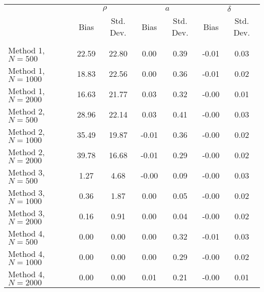 \begin{tabular}{lcccccc} \\\toprule
 & \multicolumn{2}{c}{$\rho$} & \multicolumn{2}{c}{$a$} & \multicolumn{2}{c}{$\delta$} \\ 
 & Bias & Std. Dev. & Bias & Std. Dev. & Bias & Std. Dev. \\
\cmidrule(r){2-3}\cmidrule(r){4-5}\cmidrule(r){6-7} \\
Method 1, $N=500$ & 22.59 & 22.80 & 0.00 & 0.39 & -0.01 & 0.03\\
Method 1, $N=1000$ & 18.83 & 22.56 & 0.00 & 0.36 & -0.01 & 0.02\\
Method 1, $N=2000$ & 16.63 & 21.77 & 0.03 & 0.32 & -0.00 & 0.01\\
Method 2, $N=500$ & 28.96 & 22.14 & 0.03 & 0.41 & -0.00 & 0.03\\
Method 2, $N=1000$ & 35.49 & 19.87 & -0.01 & 0.36 & -0.00 & 0.02\\
Method 2, $N=2000$ & 39.78 & 16.68 & -0.01 & 0.29 & -0.00 & 0.02\\
Method 3, $N=500$ & 1.27 & 4.68 & -0.00 & 0.09 & -0.00 & 0.03\\
Method 3, $N=1000$ & 0.36 & 1.87 & 0.00 & 0.05 & -0.00 & 0.02\\
Method 3, $N=2000$ & 0.16 & 0.91 & 0.00 & 0.04 & -0.00 & 0.02\\
Method 4, $N=500$ & 0.00 & 0.00 & 0.00 & 0.32 & -0.01 & 0.03\\
Method 4, $N=1000$ & 0.00 & 0.00 & 0.00 & 0.29 & -0.00 & 0.02\\
Method 4, $N=2000$ & 0.00 & 0.00 & 0.01 & 0.21 & -0.00 & 0.01\\
\bottomrule\end{tabular}